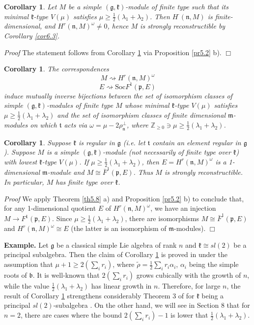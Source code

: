 \documentclass[11pt]{amsart}
\newcounter{theorem}
\newtheorem{corollary}[theo]{Corollary}
\renewenvironment{proof}{ \emph{Proof}}{$\Box$}
\renewcommand{\tt}{\mathfrak{t}}
\newcommand{\kk}{\mathfrak{k}}
\newcommand{\nn}{\mathfrak{n}}
\newcommand{\mm}{\mathfrak{m}}
\newcommand{\pp}{\mathfrak{p}}
\renewcommand{\gg}{\mathfrak{g}}
\newcommand{\bb}{\mathfrak{b}}
\newcommand{\refth}[1]{Theorem \ref{#1}}
\newcommand{\refcor}[1]{Corollary \ref{#1}}
\newcommand{\refprop}[1]{Proposition \ref{#1}}
\newcommand{\Soc}{\mathrm{Soc}}
\newcommand{\field}[1]{\mathbb{#1}}
\begin{document}
\begin{corollary}\label{cor6.4}
Let $M$ be a simple $(\gg,\kk)$-module of finite type such that its minimal $\kk$-type $V(\mu)$ satisfies $\mu\geq\frac{1}{2}(\lambda_1 + \lambda_2)$. Then $H^\cdot(\nn,M)$ is finite-dimensional, and $H^r(\nn,M)^\omega\neq 0$, hence $M$ is strongly reconstructible by \refcor{cor6.3}.
\end{corollary}
\begin{proof}
The statement follows from \refcor{cor6.4} via \refprop{pr5.2} b).
\end{proof}

\begin{corollary}\label{cor6.5}
The correspondences $$M\rightsquigarrow H^r(\nn,M)^\omega$$
$$E\rightsquigarrow\Soc F^1(\pp,E)$$
induce mutually inverse bijections between the set of isomorphism classes of simple $(\gg,\kk)$-modules of finite type $M$ whose minimal $\kk$-type $V(\mu)$ satisfies $\mu\geq\frac{1}{2}(\lambda_1 + \lambda_2)$ and the set of isomorphism classes of finite dimensional $\mm$-modules on which $\tt$ acts via $\omega = \mu - 2\rho_\nn^\perp$, where $\field{Z}_{\geq 0}\ni\mu\geq\frac{1}{2}(\lambda_1 + \lambda_2)$.
\end{corollary}
\begin{corollary}\label{cor6.6}
Suppose $\kk$ is regular in $\gg$ (i.e. let $\tt$ contain an element regular in $\gg$). Suppose $M$ is a simple $(\gg,\kk)$-module (not necessarily of finite type over $\kk$) with lowest $\kk$-type $V(\mu)$. If $\mu\geq\frac{1}{2}(\lambda_1 + \lambda_2)$, then $E=H^r(\nn,M)^\omega$ is a 1-dimensional $\mm$-module and $M\cong \bar{F}^1(\pp,E)$. Thus $M$ is strongly reconstructible. In particular, $M$ has finite type over $\kk$.
\end{corollary}
\begin{proof}
We apply \refth{th5.8} a) and \refprop{pr5.2} b) to conclude that, for any 1-dimensional quotient $E$ of $H^r(\nn,M)^\omega$, we have an injection $M\rightarrow F^1(\pp,E)$. Since $\mu\geq\frac{1}{2}(\lambda_1 + \lambda_2)$, there are isomorphisms $M\cong\bar{F}^1(\pp,E)$ and $H^r(\nn,M)^\omega\cong E$ (the latter is an isomorphism of $\mm$-modules).
\end{proof}

\textbf{Example.} Let $\gg$ be a classical simple Lie algebra of rank $n$ and $\kk\cong sl(2)$ be a principal subalgebra. Then the claim of \refcor{cor6.5} is proved in \cite{PZ2} under the assumption that $\mu+1\geq 2(\sum_i r_i)$, where $\tilde{\rho}=\frac{1}{2}\sum_i r_i\alpha_i$, $\alpha_i$ being the simple roots of $\bb$. It is well-known that $2(\sum_i r_i)$ grows cubically with the growth of $n$, while the value $\frac{1}{2}(\lambda_1+\lambda_2)$ has linear growth in $n$. Therefore, for large $n$, the result of \refcor{cor6.5} strengthens considerably Theorem 3 of \cite{PZ2} for $\kk$ being a principal $sl(2)$-subalgebra . On the other hand, we will see in Section 8 that for $n=2$, there are cases where the bound $2(\sum_i r_i)-1$ is lower that $\frac{1}{2}(\lambda_1+\lambda_2)$.
\end{document}
